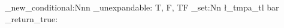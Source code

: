 \prg_new_conditional:Nnn  %
  \example_unexpandable:
  { T, F, TF }
  {
    \tl_set:Nn
      \l_tmpa_tl
      { bar }
    \prg_return_true:
  }
